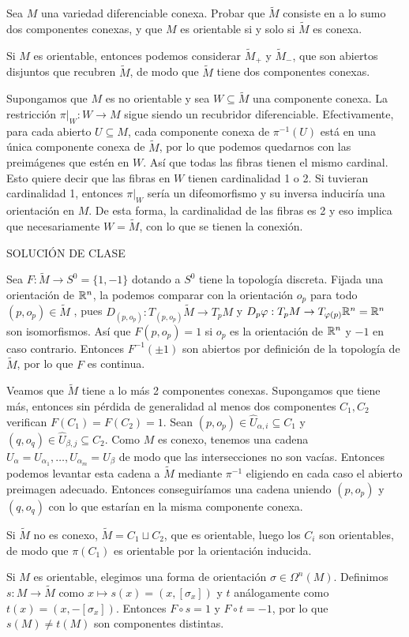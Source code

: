 \documentclass[twoside]{article}
\begin{document}
\begin{ejercicio}{9.16}
Sea $M$ una variedad diferenciable conexa. Probar que $\widetilde{M}$ consiste en a lo sumo dos componentes conexas, y que $M$ es orientable si y solo si $\widetilde{M}$ es conexa.
\end{ejercicio}
\begin{solucion}
Si $M$ es orientable, entonces podemos considerar $\widetilde{M}_+$ y $\widetilde{M}_-$, que son abiertos disjuntos que recubren $\widetilde{M}$, de modo que $\widetilde{M}$ tiene dos componentes conexas.


Supongamos que $M$ es no orientable y sea $W\subseteq\widetilde{M}$ una componente conexa. La restricción $\pi|_W: W\to M$ sigue siendo un recubridor diferenciable. Efectivamente, para cada abierto $U\subseteq M$, cada componente conexa de $\pi^{-1}(U)$ está en una única componente conexa de $\widetilde{M}$, por lo que podemos quedarnos con las preimágenes que estén en $W$. Así que todas las fibras tienen el mismo cardinal. Esto quiere decir que  las fibras en $W$ tienen cardinalidad 1 o 2. Si tuvieran cardinalidad 1, entonces $\pi|_W$ sería un difeomorfismo y su inversa induciría una orientación en $M$. De esta forma, la cardinalidad de las fibras es 2 y eso implica que necesariamente $W=\widetilde{M}$, con lo que se tienen la conexión.

SOLUCIÓN DE CLASE

Sea $F:\widetilde{M}\to S^0=\{1,-1\}$ dotando a $S^0$ tiene la topología discreta. Fijada una orientación de $\mathbb{R}^n$, la podemos comparar con la orientación $o_p$ para todo $(p,o_p)\in\widetilde{M}$ , pues $D_{(p,o_p)}:T_{(p,o_p)}\widetilde{M}\to T_pM$ y $D_p\varphi:T_pM\to T_{\varphi(p)}\mathbb{R}^n=\mathbb{R}^n$ son isomorfismos. Así que $F(p,o_p)=1$ si $o_p$ es la orientación de $\mathbb{R}^n$ y $-1$ en caso contrario. Entonces $F^{-1}(\pm 1)$ son abiertos por definición de la topología de $\widetilde{M}$, por lo que $F$ es continua. 

Veamos que $\widetilde{M}$ tiene a lo más 2 componentes conexas. Supongamos que tiene más, entonces sin pérdida de generalidad al menos dos componentes $C_1,C_2$ verifican $F(C_1)=F(C_2)=1$.  Sean $(p,o_p)\in \hat{U}_{\alpha,i}\subseteq C_1$ y $(q,o_q)\in\hat{U}_{\beta,j}\subseteq C_2$. Como $M$ es conexo, tenemos una cadena $U_\alpha=U_{\alpha_1},\dots, U_{\alpha_m}=U_{\beta}$ de modo que las intersecciones no son vacías. Entonces podemos levantar esta cadena a $\widetilde{M}$ mediante $\pi^{-1}$ eligiendo en cada caso el abierto preimagen adecuado. Entonces conseguiríamos una cadena uniendo $(p,o_p)$ y $(q,o_q)$ con lo que estarían en la misma componente conexa.

Si $\widetilde{M}$ no es conexo, $\widetilde{M}=C_1\sqcup C_2$, que es orientable, luego los $C_i$ son orientables, de modo que $\pi(C_1)$ es orientable por la orientación inducida. 

Si $M$ es orientable, elegimos una forma de orientación $\sigma\in\Omega^n(M)$. Definimos $s:M\to\widetilde{M}$ como $x\mapsto s(x)=(x,[\sigma_x])$ y $t$ análogamente como $t(x)=(x,-[\sigma_x])$. Entonces $F\circ s=1$ y $F\circ t=-1$, por lo que $s(M)\neq t(M)$ son componentes distintas.
 
\end{solucion}
\newpage
\end{document}
